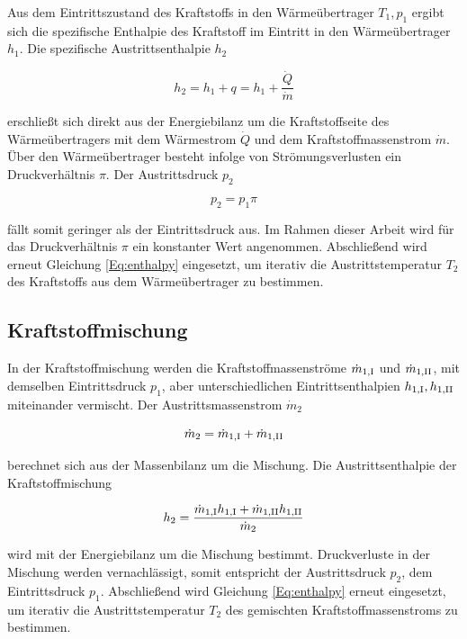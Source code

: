 Aus dem Eintrittszustand des Kraftstoffs in den Wärmeübertrager $T_1, p_1$ ergibt sich die spezifische Enthalpie des Kraftstoff im Eintritt in den Wärmeübertrager $h_1$. Die spezifische Austrittsenthalpie $h_2$

\begin{equation}\label{Eq:energy-hx}
	h_2=h_1 +q=h_1+\frac{\dot{Q}}{\dot{m}}
\end{equation}

erschließt sich direkt aus der Energiebilanz um die Kraftstoffseite des Wärmeübertragers mit dem Wärmestrom $\dot{Q}$ und dem Kraftstoffmassenstrom $\dot{m}$. Über den Wärmeübertrager besteht infolge von Strömungsverlusten ein Druckverhältnis $\pi$. Der Austrittsdruck $p_2$

\begin{equation}\label{Eq:pressuredrop}
	p_2 = p_1 \pi
\end{equation}

fällt somit geringer als der Eintrittsdruck aus. Im Rahmen dieser Arbeit wird für das Druckverhältnis $\pi$ ein konstanter Wert angenommen. Abschließend wird erneut Gleichung \ref{Eq:enthalpy} eingesetzt, um iterativ die Austrittstemperatur $T_2$ des Kraftstoffs aus dem Wärmeübertrager zu bestimmen.

\subsection{Kraftstoffmischung}

In der Kraftstoffmischung werden die Kraftstoffmassenströme $\dot{m}_{1,\mathrm{\rom{1}}}$ und $\dot{m}_{1,\mathrm{\rom{2}}}$, mit demselben Eintrittsdruck $p_1$, aber unterschiedlichen Eintrittsenthalpien $h_{1,\mathrm{\rom{1}}}, h_{1,\mathrm{\rom{2}}}$ miteinander vermischt. Der Austrittsmassenstrom $\dot{m}_2$

\begin{equation}\label{Eq:mass}
	\dot{m}_2 = \dot{m}_{1,\mathrm{\rom{1}}}+\dot{m}_{1,\mathrm{\rom{2}}}
\end{equation}

berechnet sich aus der Massenbilanz um die Mischung. Die Austrittsenthalpie der Kraftstoffmischung 

\begin{equation}\label{Eq:energy-mix}
	h_{2} = \frac{\dot{m}_{1,\mathrm{\rom{1}}}h_{1,\mathrm{\rom{1}}}+\dot{m}_{1,\mathrm{\rom{2}}}h_{1,\mathrm{\rom{2}}}}{\dot{m}_2}
\end{equation}

wird mit der Energiebilanz um die Mischung bestimmt. Druckverluste in der Mischung werden vernachlässigt, somit entspricht der Austrittsdruck $p_2$, dem Eintrittsdruck $p_1$. Abschließend wird Gleichung \ref{Eq:enthalpy} erneut eingesetzt, um iterativ die Austrittstemperatur $T_2$ des gemischten Kraftstoffmassenstroms zu bestimmen. 

